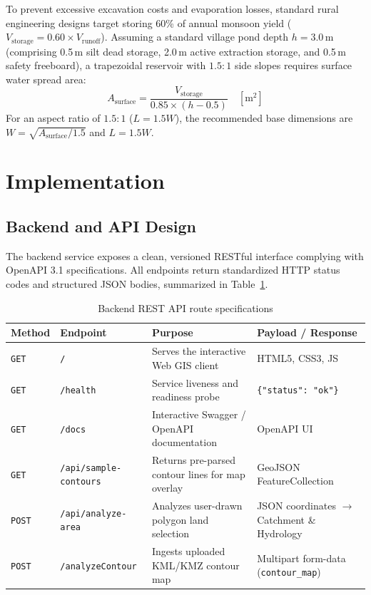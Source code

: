 \documentclass[manuscript,screen,review]{acmart}
\begin{document}
To prevent excessive excavation costs and evaporation losses, standard rural engineering designs target storing 60\% of annual monsoon yield ($V_{\text{storage}} = 0.60 \times V_{\text{runoff}}$). Assuming a standard village pond depth $h = 3.0\,\text{m}$ (comprising 0.5\,m silt dead storage, 2.0\,m active extraction storage, and 0.5\,m safety freeboard), a trapezoidal reservoir with $1.5:1$ side slopes requires surface water spread area:
$$A_{\text{surface}} = \frac{V_{\text{storage}}}{0.85 \times (h - 0.5)} \quad [\text{m}^2]$$
For an aspect ratio of $1.5:1$ ($L = 1.5 W$), the recommended base dimensions are $W = \sqrt{A_{\text{surface}} / 1.5}$ and $L = 1.5 W$.

\section{Implementation}
\label{sec:implementation}

\subsection{Backend and API Design}
The backend service exposes a clean, versioned RESTful interface complying with OpenAPI 3.1 specifications. All endpoints return standardized HTTP status codes and structured JSON bodies, summarized in Table~\ref{tab:api}.

\begin{table}[h]
  \caption{Backend REST API route specifications}
  \label{tab:api}
  \centering
  \small
  \begin{tabular}{llp{5.5cm}p{3.5cm}}
    \toprule
    \textbf{Method} & \textbf{Endpoint} & \textbf{Purpose} & \textbf{Payload / Response} \\
    \midrule
    \texttt{GET} & \texttt{/} & Serves the interactive Web GIS client & HTML5, CSS3, JS \\
    \texttt{GET} & \texttt{/health} & Service liveness and readiness probe & \texttt{\{"status": "ok"\}} \\
    \texttt{GET} & \texttt{/docs} & Interactive Swagger / OpenAPI documentation & OpenAPI UI \\
    \texttt{GET} & \texttt{/api/sample-contours} & Returns pre-parsed contour lines for map overlay & GeoJSON FeatureCollection \\
    \texttt{POST} & \texttt{/api/analyze-area} & Analyzes user-drawn polygon land selection & JSON coordinates $\to$ Catchment \& Hydrology \\
    \texttt{POST} & \texttt{/analyzeContour} & Ingests uploaded KML/KMZ contour map & Multipart form-data (\texttt{contour\_map}) \\
    \bottomrule
  \end{tabular}
\end{table}
\end{document}
